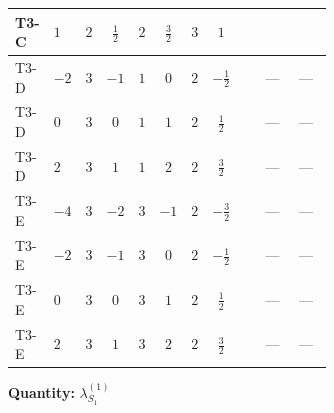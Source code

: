 \documentclass[8pt]{article}
\begin{document}
\begin{landscape}
\begin{longtable}{@{}llcccccc >{\raggedright\arraybackslash}p{0.21\linewidth} >{\raggedright\arraybackslash}p{0.21\linewidth} >{\raggedright\arraybackslash}p{0.21\linewidth}@{}}
\midrule
T3-C & $1$ & $2$ & $\frac{1}{2}$ & $2$ & $\frac{3}{2}$ & $3$ & $1$ & \scriptsize\adjustbox{max width=\linewidth}{$\begin{gathered} +12 {\lambda_{S_1}^{(1)}}^2\end{gathered}$} & \scriptsize\adjustbox{max width=\linewidth}{$\begin{gathered} +\frac{9 {g_2}^4}{4}\end{gathered}$} & \scriptsize\adjustbox{max width=\linewidth}{$\begin{gathered} +{g_1}^2 \left(\frac{3 {g_2}^2}{2}-3 {\lambda_{S_1}^{(1)}}\right)\end{gathered}$} \\
\midrule
T3-D & $-2$ & $3$ & $-1$ & $1$ & $0$ & $2$ & $-\frac{1}{2}$ & \scriptsize\adjustbox{max width=\linewidth}{$\begin{gathered} +14 {\lambda_{S_1}^{(1)}}^2\end{gathered}$} & --- & --- \\
\midrule
T3-D & $0$ & $3$ & $0$ & $1$ & $1$ & $2$ & $\frac{1}{2}$ & \scriptsize\adjustbox{max width=\linewidth}{$\begin{gathered} +14 {\lambda_{S_1}^{(1)}}^2\end{gathered}$} & --- & --- \\
\midrule
T3-D & $2$ & $3$ & $1$ & $1$ & $2$ & $2$ & $\frac{3}{2}$ & \scriptsize\adjustbox{max width=\linewidth}{$\begin{gathered} +14 {\lambda_{S_1}^{(1)}}^2\end{gathered}$} & --- & --- \\
\midrule
T3-E & $-4$ & $3$ & $-2$ & $3$ & $-1$ & $2$ & $-\frac{3}{2}$ & \scriptsize\adjustbox{max width=\linewidth}{$\begin{gathered} +14 {\lambda_{S_1}^{(1)}}^2\end{gathered}$} & --- & --- \\
\midrule
T3-E & $-2$ & $3$ & $-1$ & $3$ & $0$ & $2$ & $-\frac{1}{2}$ & \scriptsize\adjustbox{max width=\linewidth}{$\begin{gathered} +14 {\lambda_{S_1}^{(1)}}^2\end{gathered}$} & --- & --- \\
\midrule
T3-E & $0$ & $3$ & $0$ & $3$ & $1$ & $2$ & $\frac{1}{2}$ & \scriptsize\adjustbox{max width=\linewidth}{$\begin{gathered} +14 {\lambda_{S_1}^{(1)}}^2\end{gathered}$} & --- & --- \\
\midrule
T3-E & $2$ & $3$ & $1$ & $3$ & $2$ & $2$ & $\frac{3}{2}$ & \scriptsize\adjustbox{max width=\linewidth}{$\begin{gathered} +14 {\lambda_{S_1}^{(1)}}^2\end{gathered}$} & --- & --- \\
\midrule
\bottomrule
\end{longtable}
\clearpage
\noindent\textbf{Quantity: }$\lambda_{S_1}^{(1)}$\par\smallskip

\end{landscape}
\end{document}
